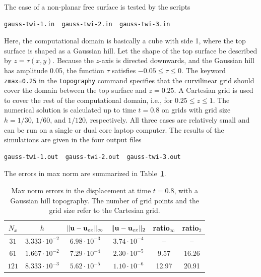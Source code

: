 \documentclass[11pt]{report}
\newcommand{\ub}{{\bf u}}
\begin{document}
The case of a non-planar free surface is tested by the scripts
\begin{verbatim}
gauss-twi-1.in  gauss-twi-2.in  gauss-twi-3.in
\end{verbatim}
Here, the computational domain is basically a cube with side 1, where the top surface is shaped as a
Gaussian hill. Let the shape of the top surface be described by $z=\tau(x,y)$. Because the $z$-axis
is directed downwards, and the Gaussian hill has amplitude 0.05, the function $\tau$ satisfies
$-0.05\leq \tau\leq 0$. The keyword {\tt zmax=0.25} in the {\tt topography} command specifies that
the curvilinear grid should cover the domain between the top surface and $z=0.25$. A Cartesian grid
is used to cover the rest of the computational domain, i.e., for $0.25\leq z\leq 1$. The numerical
solution is calculated up to time $t=0.8$ on grids with grid size $h=1/30$, $1/60$, and $1/120$,
respectively. All three cases are relatively small and can be run on a single or dual core
laptop computer. 
The results of the simulations are given in the four output files
\begin{verbatim}
gauss-twi-1.out  gauss-twi-2.out  gauss-twi-3.out
\end{verbatim}
The errors in max norm are summarized in Table~\ref{tab:twi-gauss-err}.
\begin{table}
\begin{center}
\begin{tabular}{| c | c | c | c | c  | c | }
\hline
$N_x$ & $h$ & $\| \ub - \ub_{ex}\|_\infty$ & $\| \ub - \ub_{ex}\|_2$ & ratio$_\infty$ & ratio$_2$ \\ \hline
$31$  & $3.333\cdot 10^{-2}$  & $6.98\cdot 10^{-3}$ & $3.74\cdot 10^{-4}$ & --   & --   \\ \hline
$61$  & $1.667\cdot 10^{-2}$  & $7.29\cdot 10^{-4}$ & $2.30\cdot 10^{-5}$ & 9.57 & 16.26 \\ \hline
$121$ & $8.333\cdot 10^{-3}$  & $5.62\cdot 10^{-5}$ & $1.10\cdot 10^{-6}$ & 12.97 & 20.91 \\ \hline
\end{tabular}
\caption{Max norm errors in the displacement at time $t=0.8$, with a Gaussian hill topography. The
  number of grid points and the grid size refer to the Cartesian grid.}
\label{tab:twi-gauss-err}
\end{center}
\end{table}
\end{document}
